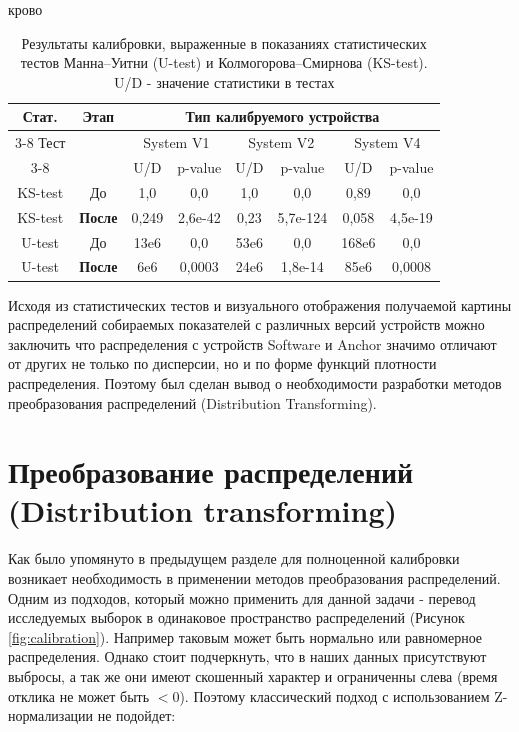 \begin{table}[!ht]крово
	\centering
	\caption{Результаты калибровки, выраженные в показаниях статистических тестов Манна–Уитни (U-test) и Колмогорова–Смирнова (KS-test). U/D - значение статистики в тестах}
	\begin{tabular}{|c|c|c|c|c|c|c|c|}
		\hline
		Стат. & \multirow{3}{*}{Этап} & \multicolumn{6}{c|}{Тип калибруемого устройства} \\ \cline{3-8}
		Тест & & \multicolumn{2}{c|}{System V1}
		& \multicolumn{2}{c|}{System V2} 
		& \multicolumn{2}{c|}{System V4} \\ \cline{3-8}
		& & U/D & p-value
		& U/D & p-value
		& U/D  & p-value \\ \hline
		KS-test & До     & 1,0        & 0,0        & 1,0         & 0,0                  & 0,89    & 0,0        \\ \hline
		KS-test & \textbf{После}  & 0,249      & 2,6e-42    & 0,23        & 5,7e-124    & 0,058   & 4,5e-19    \\ \hline
		U-test  & До     & 13e6       & 0,0        & 53e6        & 0,0                  & 168e6   & 0,0        \\ \hline
		U-test  & \textbf{После}  & 6e6        & 0,0003     & 24e6        & 1,8e-14     & 85e6    & 0,0008     \\ \hline
	\end{tabular}
	\label{calib1}
\end{table}




Исходя из статистических тестов и визуального отображения получаемой картины распределений собираемых показателей с различных версий устройств можно заключить что распределения с устройств Software и Anchor значимо отличают от других не только по дисперсии, но и по форме функций плотности распределения. Поэтому был сделан вывод о необходимости разработки методов преобразования распределений (Distribution Transforming).
 

\section{Преобразование распределений (Distribution transforming)}\label{subsec:ch3/sect4}

Как было упомянуто в предыдущем разделе для полноценной калибровки возникает необходимость в применении методов преобразования распределений. Одним из подходов, который можно применить для данной задачи - перевод исследуемых выборок в одинаковое пространство распределений (Рисунок \ref{fig:calibration}). Например таковым может быть нормально или равномерное распределения. Однако стоит подчеркнуть, что в наших данных присутствуют выбросы, а так же они имеют скошенный характер и ограниченны слева (время отклика не может быть $<0$). Поэтому классический подход с использованием Z-нормализации не подойдет:

